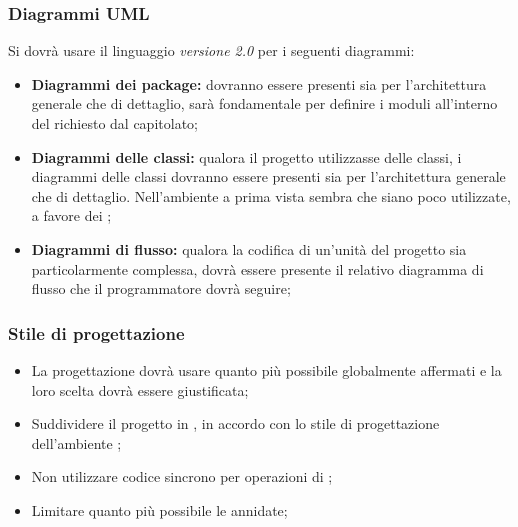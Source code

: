     \subsubsection{Diagrammi UML}
    Si dovrà usare il linguaggio  \emph{versione 2.0} per i seguenti diagrammi:
\begin{itemize}
 \item \textbf{Diagrammi dei package:} dovranno essere presenti sia per l'architettura generale che di dettaglio, sarà fondamentale per definire i moduli all'interno del   richiesto dal capitolato;
 \item \textbf{Diagrammi delle classi:} qualora il progetto utilizzasse delle classi, i diagrammi delle classi dovranno essere presenti sia per l'architettura generale che di dettaglio. Nell'ambiente  a prima vista sembra che siano poco utilizzate, a favore dei ;
 \item \textbf{Diagrammi di flusso:} qualora la codifica di un'unità del progetto sia particolarmente complessa, dovrà essere presente il relativo diagramma di flusso che il programmatore dovrà seguire;
\end{itemize}

    \subsubsection{Stile di progettazione}
    \begin{itemize}
        \item La progettazione dovrà usare quanto più possibile  globalmente affermati e la loro scelta dovrà essere giustificata;
        \item Suddividere il progetto in , in accordo con lo stile di progettazione dell'ambiente ;
        \item Non utilizzare codice sincrono per operazioni di ;
        \item Limitare quanto più possibile le  annidate;
    \end{itemize}




